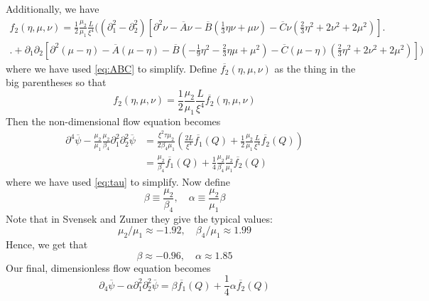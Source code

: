 \documentclass[reqno]{article}
\begin{document}
	Additionally, we have
	\begin{multline}
		f_2(\eta, \mu, \nu) = \frac12 \frac{\mu_2}{\mu_1} \frac{L}{\xi^4} \biggl( \left( \partial_1^2 - \partial_2^2\right)\left[ \partial^2 \nu - \overline{A}\nu - \overline{B}\left(\tfrac{1}{3}\eta\nu + \mu\nu\right) - \overline{C}\nu\left( \tfrac{2}{3}\eta^2 + 2\nu^2 + 2\mu^2 \right) \right]\biggr. \\
		\biggl. + \partial_1\partial_2 \left[ \partial^2 \left( \mu - \eta \right) - \overline{A}\left( \mu - \eta \right) - \overline{B}\left( -\tfrac19 \eta^2 - \tfrac23 \eta\mu + \mu^2 \right) - \overline{C}\left( \mu - \eta\right) \left( \tfrac23 \eta^2 + 2\nu^2 + 2\mu^2 \right)\right] \biggr) 
	\end{multline}
	where we have used \eqref{eq:ABC} to simplify. Define $\overline{f_2}(\eta, \mu, \nu)$ as the thing in the big parentheses so that
	\begin{equation}
		f_2(\eta, \mu, \nu) = \frac12 \frac{\mu_2}{\mu_1} \frac{L}{\xi^4} \overline{f_2}(\eta, \mu, \nu)
	\end{equation}
	Then the non-dimensional flow equation becomes
	\begin{equation}
	\begin{split}
		\partial^4 \overline{\psi}
		- \frac{\mu_2}{\mu_1} \frac{\mu_2}{\beta_4} \partial_1^2 \partial_2^2 \overline{\psi}
		&= \frac{\xi^2 \tau \mu_2}{2\beta_4 \mu_1} \left( \frac{2L}{\xi^4} \overline{f_1}(Q) + \frac12 \frac{\mu_2}{\mu_1} \frac{L}{\xi^4} \overline{f_2}(Q) \right) \\
		&= \frac{\mu_2}{\beta_4} \overline{f_1}(Q) + \frac14 \frac{\mu_2}{\beta_4} \frac{\mu_2}{\mu_1} \overline{f_2}(Q)
	\end{split}
	\end{equation}
	where we have used \eqref{eq:tau} to simplify. Now define
	\begin{equation}
		\beta \equiv \frac{\mu_2}{\beta_4},
		\quad
		\alpha \equiv \frac{\mu_2}{\mu_1} \beta
	\end{equation}
	Note that in Svensek and Zumer they give the typical values:
	\begin{equation}
		\mu_2/\mu_1 \approx -1.92,
		\quad \beta_4/\mu_1 \approx 1.99
	\end{equation}
	Hence, we get that
	\begin{equation}
		\beta \approx -0.96,
		\quad \alpha \approx 1.85
	\end{equation}
	Our final, dimensionless flow equation becomes
	\begin{equation}
		\partial_4 \overline{\psi}
		- \alpha \partial_1^2 \partial_2^2 \overline{\psi}
		= \beta \overline{f_1}(Q) + \frac14 \alpha \overline{f_2}(Q)
	\end{equation}
\end{document}
